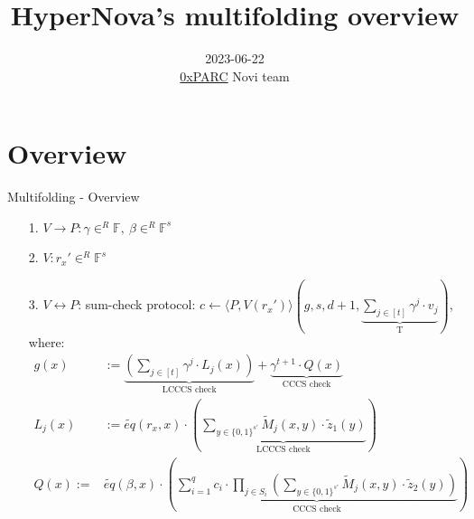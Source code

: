 \documentclass{beamer}
\title{HyperNova's multifolding overview}
\author{}
\date{\scriptsize{2023-06-22\\\href{https://0xparc.org}{0xPARC} Novi team}}
\begin{document}
\frame{\titlepage}

\section[Overview]{Overview}

\begin{frame}{Multifolding - Overview}

  \begin{tiny}
  \begin{enumerate}
    \item[1.] $V \rightarrow P: \gamma \in^R \mathbb{F},~ \beta \in^R \mathbb{F}^s$
    \item[2.] $V: r_x' \in^R \mathbb{F}^s$
    \item[3.] $V \leftrightarrow P$: sum-check protocol:
		  $c \leftarrow \langle P, V(r_x') \rangle (g, s, d+1, \underbrace{\sum_{j \in [t]} \gamma^j \cdot v_j}_\text{T})$, where:
		  \begin{align*}
			  g(x) &:= \underbrace{\left( \sum_{j \in [t]} \gamma^j \cdot L_j(x) \right)}_\text{LCCCS check} + \underbrace{\gamma^{t+1} \cdot Q(x)}_\text{CCCS check}\\
			  L_j(x) &:= \widetilde{eq}(r_x, x) \cdot \left(
				  \underbrace{\sum_{y \in \{0,1\}^{s'}} \widetilde{M}_j(x, y) \cdot \widetilde{z}_1(y)}_\text{LCCCS check}
			  \right)\\
				  Q(x) := &\widetilde{eq}(\beta, x) \cdot \left(
				  \underbrace{ \sum_{i=1}^q c_i \cdot \prod_{j \in S_i} \left( \sum_{y \in \{0, 1\}^{s'}} \widetilde{M}_j(x, y) \cdot \widetilde{z}_2(y) \right) }_\text{CCCS check}
			  \right)
		  \end{align*}
  \end{enumerate}
  \end{tiny}

\end{frame}
\end{document}
